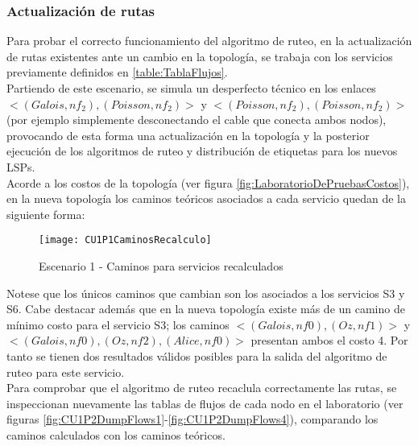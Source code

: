 
\newpage
\subsubsection{Actualizaci\'on de rutas}
Para probar el correcto funcionamiento del algoritmo de ruteo, en la actualizaci\'on de rutas existentes ante un cambio en la topolog\'ia, se trabaja con los servicios previamente definidos en \ref{table:TablaFlujos}.\\ 

Partiendo de este escenario, se simula un desperfecto t\'ecnico en los enlaces \\ $<(Galois, nf_2), (Poisson, nf_2)>$ y  $<(Poisson, nf_2), (Poisson, nf_2)>$ (por ejemplo simplemente desconectando el cable que conecta ambos nodos), provocando de esta forma una actualizaci\'on en la topolog\'ia y la posterior ejecuci\'on de los algoritmos de ruteo y distribución de etiquetas para los nuevos LSPs.\\ 
 
Acorde a los costos de la topolog\'ia (ver figura \ref{fig:LaboratorioDePruebasCostos}), en la nueva topolog\'ia los caminos te\'oricos asociados a cada servicio quedan de la siguiente forma:

\newpage
\begin{figure}[ht!] 
\centering    
\texttt{[image: CU1P1CaminosRecalculo]}
\caption[Escenario 1 - Caminos para servicios recalculados]{Escenario 1 - Caminos para servicios recalculados}
\label{fig:CUP1Caminos2}
\end{figure}
 
Notese que los \'unicos caminos que cambian son los asociados a los servicios S3 y S6. Cabe destacar adem\'as que en la nueva topolog\'ia existe m\'as de un camino de m\'inimo costo para el servicio S3; los caminos $<(Galois, nf0), (Oz, nf1)>$ y $<(Galois, nf0), (Oz, nf2), (Alice, nf0)>$ presentan ambos el costo 4. Por tanto se tienen dos resultados v\'alidos posibles para la salida del algoritmo de ruteo para este servicio.\\

Para comprobar que el algoritmo de ruteo recaclula correctamente las rutas, se inspeccionan nuevamente las tablas de flujos de cada nodo en el laboratorio (ver figuras \ref{fig:CU1P2DumpFlows1}-\ref{fig:CU1P2DumpFlows4}), comparando los caminos calculados con los caminos te\'oricos.\\


